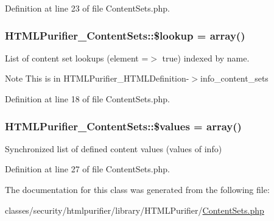 Definition at line 23 of file Content\+Sets.\+php.

\hypertarget{classHTMLPurifier__ContentSets_a4edc2744f4c253f1958ccae6a8894c5f}{
\subsubsection[{\$lookup}]{\setlength{\rightskip}{0pt plus 5cm}H\+T\+M\+L\+Purifier\+\_\+\+Content\+Sets\+::\$lookup = array()}}\label{classHTMLPurifier__ContentSets_a4edc2744f4c253f1958ccae6a8894c5f}
List of content set lookups (element =$>$ true) indexed by name. \begin{DoxyNote}{Note}
This is in H\+T\+M\+L\+Purifier\+\_\+\+H\+T\+M\+L\+Definition-\/$>$info\+\_\+content\+\_\+sets 
\end{DoxyNote}


Definition at line 18 of file Content\+Sets.\+php.

\hypertarget{classHTMLPurifier__ContentSets_a60b13361a83f3b845d8e1af0719333fe}{
\subsubsection[{\$values}]{\setlength{\rightskip}{0pt plus 5cm}H\+T\+M\+L\+Purifier\+\_\+\+Content\+Sets\+::\$values = array()\hspace{0.3cm}{\ttfamily [protected]}}}\label{classHTMLPurifier__ContentSets_a60b13361a83f3b845d8e1af0719333fe}
Synchronized list of defined content values (values of info) 

Definition at line 27 of file Content\+Sets.\+php.



The documentation for this class was generated from the following file\+:\begin{DoxyCompactItemize}
\item 
classes/security/htmlpurifier/library/\+H\+T\+M\+L\+Purifier/\hyperlink{ContentSets_8php}{Content\+Sets.\+php}\end{DoxyCompactItemize}
